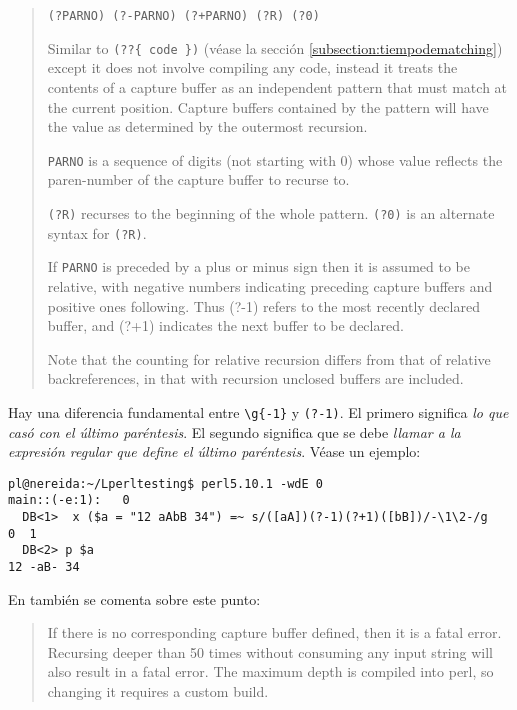

\begin{it}
\begin{quotation}
\verb|(?PARNO) (?-PARNO) (?+PARNO) (?R) (?0)|

Similar to \verb|(??{ code })| (véase la sección
\ref{subsection:tiempodematching})
except it does not involve compiling any code,
instead it treats the contents of a capture buffer as an independent
pattern that must match at the current position. Capture buffers
contained by the pattern will have the value as determined by the
outermost recursion.

\verb|PARNO| is a sequence of digits (not starting with 0) whose value
reflects the paren-number of the capture buffer to recurse to. 

\verb|(?R)|
recurses to the beginning of the whole pattern. \verb|(?0)| is an alternate
syntax for \verb|(?R)|. 

If \verb|PARNO| is preceded by a plus or minus sign then it
is assumed to be relative, with negative numbers indicating preceding
capture buffers and positive ones following. Thus (?-1) refers to the
most recently declared buffer, and (?+1) indicates the next buffer to
be declared. 

Note that the counting for relative recursion differs from
that of relative backreferences, in that with recursion unclosed buffers
are included.
\end{quotation}
\end{it}
Hay una diferencia fundamental entre \verb|\g{-1}| y \verb|(?-1)|.
El primero significa {\it lo que casó con el último paréntesis}.
El segundo significa que se debe {\it llamar a la expresión regular 
que define el último paréntesis}. Véase un ejemplo:
\begin{verbatim}
pl@nereida:~/Lperltesting$ perl5.10.1 -wdE 0
main::(-e:1):   0
  DB<1>  x ($a = "12 aAbB 34") =~ s/([aA])(?-1)(?+1)([bB])/-\1\2-/g
0  1
  DB<2> p $a
12 -aB- 34
\end{verbatim}

En  también se comenta sobre este punto:
\begin{it}\begin{quotation} 
If there is no corresponding capture buffer defined, then it is a fatal
error. Recursing deeper than 50 times without consuming any input string
will also result in a fatal error. The maximum depth is compiled into
perl, so changing it requires a custom build.
\end{quotation}
\end{it}


